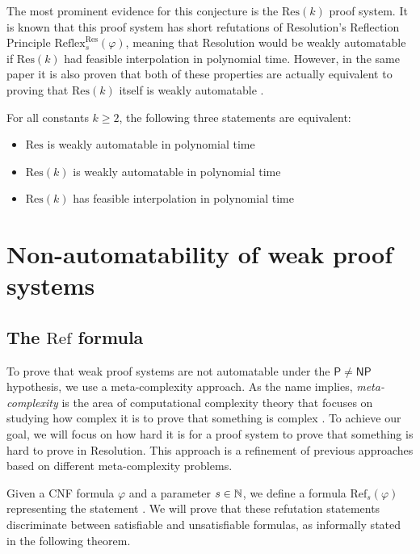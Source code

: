The most prominent evidence for this conjecture is the $\mathrm{Res}(k)$ proof system. It is known \cite{resk_weakauto} that this proof system has short refutations of Resolution's Reflection Principle $\mathrm{Reflex}_s^{\mathrm{Res}}(\varphi)$, meaning that Resolution would be weakly automatable if $\mathrm{Res}(k)$ had feasible interpolation in polynomial time. However, in the same paper it is also proven that both of these properties are actually equivalent to proving that $\mathrm{Res}(k)$ itself is weakly automatable \cite{resk_weakauto}.

\begin{theorem}
    \label{thm:resk_fi}
    For all constants $k \geq 2$, the following three statements are equivalent:
    \begin{itemize}[nosep]
        \item $\mathrm{Res}$ is weakly automatable in polynomial time
        \item $\mathrm{Res}(k)$ is weakly automatable in polynomial time
        \item $\mathrm{Res}(k)$ has feasible interpolation in polynomial time
    \end{itemize}
\end{theorem}

\section{Non-automatability of weak proof systems}
\label{sec:weak_systems}

\subsection{The $\mathrm{Ref}$ formula}

To prove that weak proof systems are not automatable under the $\mathsf{P} \neq \mathsf{NP}$ hypothesis, we use a meta-complexity approach. As the name implies, \textit{meta-complexity} is the area of computational complexity theory that focuses on studying how complex it is to prove that something is complex \cite{simons}. To achieve our goal, we will focus on how hard it is for a proof system to prove that something is hard to prove in Resolution. This approach is a refinement of previous approaches \cite{res_wphard, pc_wphard,res_hard_proofs} based on different meta-complexity problems.

Given a CNF formula $\varphi$ and a parameter $s \in \mathbb{N}$, we define a formula $\mathrm{Ref}_s(\varphi)$ representing the statement  \cite{pudlak_upper,res_nphard,alg_nphard, pap}. We will prove that these refutation statements discriminate between satisfiable and unsatisfiable formulas, as informally stated in the following theorem.

